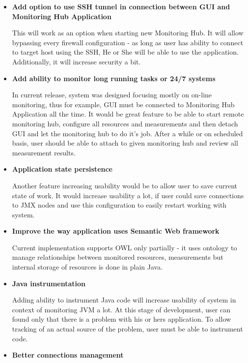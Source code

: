 \begin{itemize}
 \item {\bf Add option to use SSH tunnel in connection between GUI and Monitoring Hub Application}
 
 This will work as an option when starting new Monitoring Hub. It will allow bypassing every firewall configuration - as long as user has ability to connect to target host using the SSH, He or She will be able to use the application. Additionally, it will increase security a bit.
 
\item {\bf Add ability to monitor long running tasks or 24/7 systems }  

In current release, system was designed focusing mostly on on-line monitoring, thus for example, GUI must be connected to Monitoring Hub Application all the time. It would be great feature to be able to start remote monitoring hub, configure all resources and measurements and then detach GUI and let the monitoring hub to do it\rq{}s job. After a while or on scheduled basis, user should be able to attach to given monitoring hub and review all measurement results.

\item {\bf Application state persistence }  

Another feature increasing usability would be to allow user to save current state of work. It would increase usability a lot, if user could save connections to JMX nodes and use this configuration to easily restart working with system. 

 \item {\bf Improve the way application uses Semantic Web framework} 
     
Current implementation supports OWL only partially - it uses ontology to manage relationships between monitored resources, measurements but internal storage of resources is done in plain Java.
          
\item {\bf Java instrumentation}

Adding ability to instrument Java code will increase usability of system in context of monitoring JVM a lot. At this stage of development, user can found only that there is a problem with his or hers application. To allow tracking of an actual source of the problem, user must be able to instrument code.      
     
\item {\bf Better connections management}


\end{itemize}
